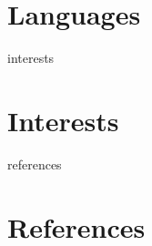 \documentclass[12pt]{report} %
\begin{document}
\section{Languages}
\languages{}
\fi



\ifcsname interests\endcsname%
\section{Interests}
\interests{}
\fi



\ifcsname references\endcsname%
\section{References}
\fi


\end{document}
